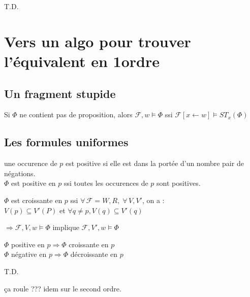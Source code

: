 \documentclass[10pt,a4paper]{article}
\newcommand{\F}{\mathcal{F}}
\begin{document}
\begin{dem}
 T.D.
\end{dem}


\section{Vers un algo pour trouver l'équivalent en 1\ier ordre}

\subsection{Un fragment stupide}

\begin{prop}
 Si $\Phi$ ne contient pas de proposition, alors $\F, w \models \Phi$ ssi $\F[x \leftarrow w ] \models ST_x(\Phi)$
\end{prop}

\subsection{Les formules uniformes}

\begin{definition}
une occurence de $p$ est positive si elle est dans la portée d'un nombre pair de négations.\\
$\Phi$ est positive en $p$ ssi toutes les occurences de $p$ sont positives.
\end{definition}

\begin{definition}
 $\Phi$ est croissante en $p$ ssi $\forall \,\F = W, R, \;\forall \, V, V'$, on a :\\
$V(p) \subseteq V'(P)$ et $\forall q \not = p, V(q) \subseteq V'(q) $

 $ \Rightarrow \F, V, w \models \Phi$ implique $\F, V', w \models \Phi$
\end{definition}

\begin{prop}
 $\Phi$ positive en $p \Rightarrow \Phi$ croissante en $p$\\
$\Phi$ négative en $p \Rightarrow \Phi$ décroissante en $p$
\end{prop}
\begin{dem}
 T.D.
\end{dem}

\begin{rem}
 ça roule ??? idem sur le second ordre.
\end{rem}
\end{document}
